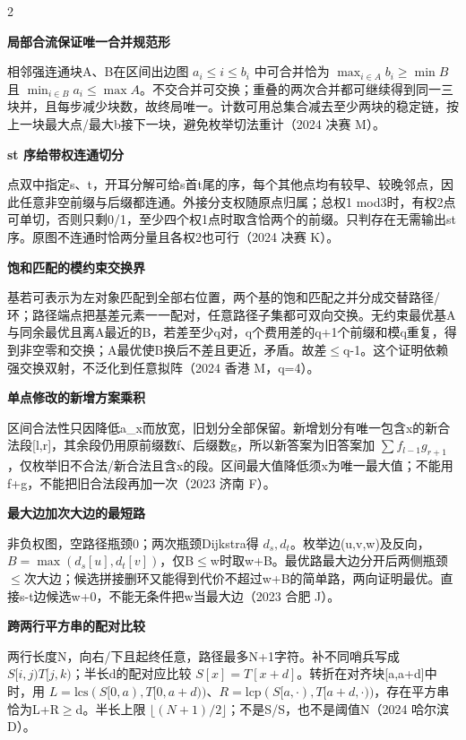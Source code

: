 \documentclass[UTF8,fontset=fandol,a4paper,twoside]{ctexart}
\newcommand{\note}[1]{{\fontsize{10}{12}\selectfont #1\par}}
\begin{document}
\begin{multicols}{2}
\par\textbf{局部合流保证唯一合并规范形}\quad
\note{相邻强连通块A、B在区间出边图 $a_i\le i\le b_i$ 中可合并恰为 $\max_{i\in A}b_i\ge\min B$ 且 $\min_{i\in B}a_i\le\max A$。不交合并可交换；重叠的两次合并都可继续得到同一三块并，且每步减少块数，故终局唯一。计数可用总集合减去至少两块的稳定链，按上一块最大点/\allowbreak{}最大b接下一块，避免枚举切法重计（2024 决赛 M）。}
\par\textbf{st 序给带权连通切分}\quad
\note{点双中指定s、t，开耳分解可给s首t尾的序，每个其他点均有较早、较晚邻点，因此任意非空前缀与后缀都连通。外接分支权随原点归属；总权1 mod3时，有权2点可单切，否则只剩0/\allowbreak{}1，至少四个权1点时取含恰两个的前缀。只判存在无需输出st序。原图不连通时恰两分量且各权2也可行（2024 决赛 K）。}
\par\textbf{饱和匹配的模约束交换界}\quad
\note{基若可表示为左对象匹配到全部右位置，两个基的饱和匹配之并分成交替路径/\allowbreak{}环；路径端点把基差元素一一配对，任意路径子集都可双向交换。无约束最优基A与同余最优且离A最近的B，若差至少q对，q个费用差的q+\allowbreak{}1个前缀和模q重复，得到非空零和交换；A最优使B换后不差且更近，矛盾。故差\ensuremath{\le}q-\allowbreak{}1。这个证明依赖强交换双射，不泛化到任意拟阵（2024 香港 M，q=\allowbreak{}4）。}
\par\textbf{单点修改的新增方案乘积}\quad
\note{区间合法性只因降低a\_x而放宽，旧划分全部保留。新增划分有唯一包含x的新合法段[\allowbreak{}l,\allowbreak{}r]\allowbreak{}，其余段仍用原前缀数f、后缀数g，所以新答案为旧答案加 $\sum f_{l-1}g_{r+1}$，仅枚举旧不合法/\allowbreak{}新合法且含x的段。区间最大值降低须x为唯一最大值；不能用f+\allowbreak{}g，不能把旧合法段再加一次（2023 济南 F）。}
\par\textbf{最大边加次大边的最短路}\quad
\note{非负权图，空路径瓶颈0；两次瓶颈Dijkstra得 $d_s,d_t$。枚举边(\allowbreak{}u,\allowbreak{}v,\allowbreak{}w)\allowbreak{}及反向，$B=\max(d_s[u],d_t[v])$，仅B\ensuremath{\le}w时取w+\allowbreak{}B。最优路最大边分开后两侧瓶颈\ensuremath{\le}次大边；候选拼接删环又能得到代价不超过w+\allowbreak{}B的简单路，两向证明最优。直接s-\allowbreak{}t边候选w+\allowbreak{}0，不能无条件把w当最大边（2023 合肥 J）。}
\par\textbf{跨两行平方串的配对比较}\quad
\note{两行长度N，向右/\allowbreak{}下且起终任意，路径最多N+\allowbreak{}1字符。补不同哨兵写成 $S[i,j)T[j,k)$；半长d的配对应比较 $S[x]=T[x+d]$。转折在对齐块[\allowbreak{}a,\allowbreak{}a+\allowbreak{}d]\allowbreak{}中时，用 $L=\mathrm{lcs}(S[0,a),T[0,a+d))$、$R=\mathrm{lcp}(S[a,\cdot),T[a+d,\cdot))$，存在平方串恰为L+\allowbreak{}R\ensuremath{\ge}d。半长上限 $\lfloor(N+1)/2\rfloor$；不是S/\allowbreak{}S，也不是阈值N（2024 哈尔滨 D）。}

\end{multicols}
\end{document}
